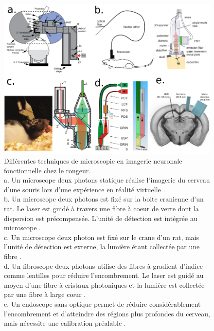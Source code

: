\begin{figure}
\centering
\includegraphics[width=\textwidth]{./files/fiber_functional_imaging.svg.png}
\caption{Différentes techniques de microscopie en imagerie neuronale fonctionnelle chez le rongeur.\\
a. Un microscope deux photons statique réalise l'imagerie du cerveau d'une souris lors d'une expérience en réalité virtuelle \cite{dombeck_functional_2010}.\\
b. Un microscope deux photons est fixé sur la boite cranienne d'un rat. Le laser est guidé à travers une fibre à coeur de verre dont la dispersion est précompensée. L'unité de détection est intégrée au microscope \cite{helmchen_miniature_2001}.\\
c. Un microscope deux photon est fixé sur le crane d'un rat, mais l'unité de détection est externe, la lumière étant collectée par une fibre \cite{sawinski_visually_2009}. \\
d. Un fibroscope deux photons utilise des fibres à gradient d'indice comme lentilles pour réduire l'encombrement. Le laser est guidé au moyen d'une fibre à cristaux photoniques et la lumière est collectée par une fibre à large cœur \cite{engelbrecht_ultra-compact_2008}. \\
e. Un endoscope sans optique permet de réduire considérablement l'encombrement et d'atteindre des régions plus profondes du cerveau, mais nécessite une calibration préalable \cite{turtaev_high-fidelity_2018}.
}
\end{figure}




